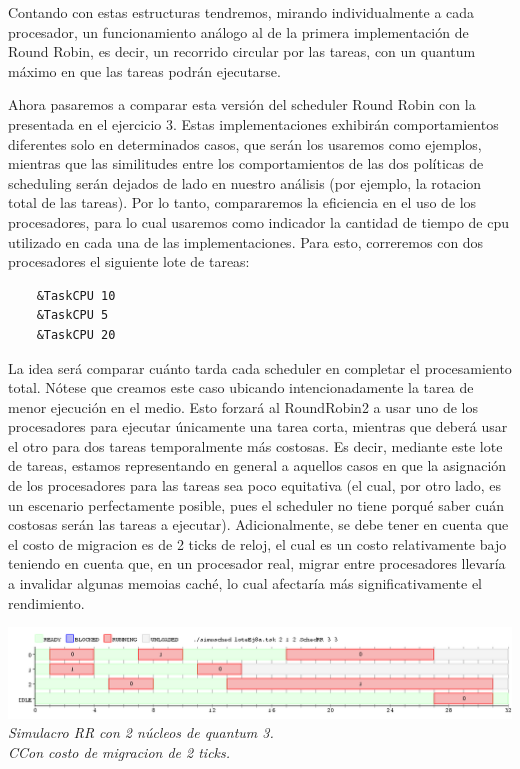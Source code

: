 Contando con estas estructuras tendremos, mirando individualmente a cada procesador, un funcionamiento an\'alogo al de la primera implementaci\'on
de Round Robin, es decir, un recorrido circular por las tareas, con un quantum m\'aximo en que las tareas podr\'an ejecutarse.

Ahora pasaremos a comparar esta versi\'on del scheduler Round Robin con la presentada en el ejercicio 3. Estas implementaciones exhibir\'an comportamientos 
diferentes solo en determinados casos, que ser\'an los usaremos como ejemplos, mientras que las similitudes entre los comportamientos de las dos pol\'iticas
de scheduling ser\'an dejados de lado en nuestro an\'alisis (por ejemplo, la rotacion total de 
las tareas). Por lo tanto, compararemos la eficiencia en el uso de los procesadores, para lo cual usaremos como indicador la cantidad de tiempo de cpu 
utilizado en cada una de las implementaciones.
Para esto, correremos con dos procesadores el siguiente lote de tareas:

\begin{verbatim}
    &TaskCPU 10
    &TaskCPU 5
    &TaskCPU 20
\end{verbatim}

 La idea ser\'a comparar cu\'anto tarda cada scheduler en completar el procesamiento total. N\'otese que creamos este caso ubicando 
 intencionadamente la tarea de menor ejecuci\'on en el medio. Esto forzar\'a al RoundRobin2 a usar uno de los procesadores 
 para ejecutar \'unicamente una tarea corta, mientras que deber\'a usar el otro para dos tareas temporalmente m\'as costosas.
 Es decir, mediante este lote de tareas, estamos representando en general a aquellos casos en que la asignaci\'on de los procesadores 
 para las tareas sea poco equitativa (el cual, por otro lado, es un escenario perfectamente posible, pues el scheduler no tiene porqu\'e
 saber cu\'an costosas ser\'an las tareas a ejecutar). Adicionalmente, se debe tener en cuenta que el costo de migracion 
 es de 2 ticks de reloj, el cual es un costo relativamente bajo teniendo en cuenta que, en un procesador real, migrar entre procesadores
 llevar\'ia a invalidar algunas memoias cach\'e, lo cual afectar\'ia m\'as significativamente el rendimiento.

\vspace{\baselineskip}
\begin{center}
\includegraphics[scale=0.45]{../tp1/Test/resEj8Co2SBRR.png}
\\
\vspace{1pt}
\footnotesize\textit{Simulacro RR con 2 n\'ucleos de quantum 3.\\CCon costo de migracion de 2 ticks.}
\end{center}
\vspace{\baselineskip}

